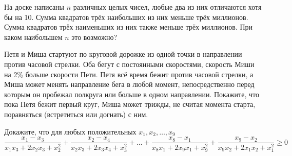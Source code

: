 \documentclass{article}
\begin{document}
\begin{enumerate_boxed}
        \item На доске написаны $n$ различных целых чисел, любые два из них отличаются хотя бы на 10.
        Сумма квадратов трёх наибольших из них меньше трёх миллионов.
        Сумма квадратов трёх наименьших из них также меньше трёх миллионов.
        При каком наибольшем $n$ это возможно?

        \item Петя и Миша стартуют по круговой дорожке из одной точки в направлении против часовой стрелки.
        Оба бегут с постоянными скоростями, скорость Миши на 2\% больше скорости Пети.
        Петя всё время бежит против часовой стрелки, а Миша может менять направление бега в любой момент, непосредственно перед которым он пробежал полкруга или больше в одном направлении.
        Покажите, что пока Петя бежит первый круг, Миша может трижды, не считая момента старта, поравняться (встретиться или догнать) с ним.

        \item Докажите, что для любых положительных $x_1, x_2, \dotsc , x_9$
        \[\frac{x_1 - x_3}{x_{1}x_3 + 2x_{2}x_3 + x_2^2} + \frac{x_2 - x_4}{x_{2}x_3 + 2x_{3}x_4 + x_3^2} + \dotsc + \frac{x_8 - x_1}{x_{8}x_1 + 2x_{9}x_1 + x_9^2} + \frac{x_9 - x_2}{x_{9}x_2 + 2x_{1}x_2 + x_1^2} \geqslant 0\]

    \end{enumerate_boxed}
\end{document}
